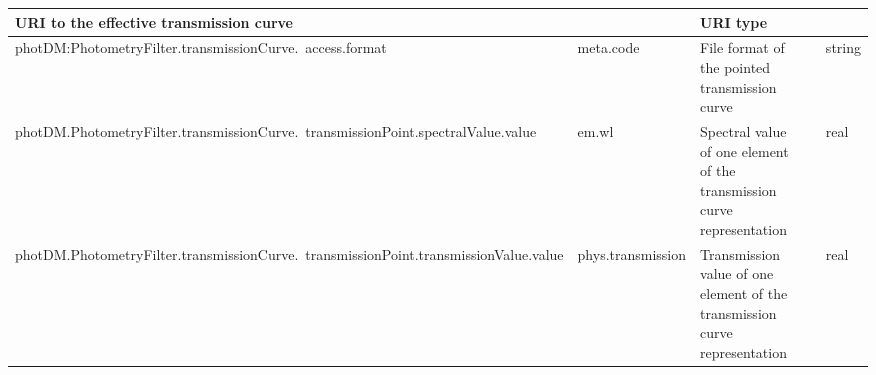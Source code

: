 \documentclass[11pt,a4paper]{ivoa}
\begin{document}
\begin{appendices}
\begin{table}[H]
\begin{adjustbox}{angle=90}
\begin{tabular}{p{2.5in}|p{1.5in}|p{2in}|p{0.74in}|p{0.35in}}
\multicolumn{1}{p{2in}}{{\fontsize{8pt}{8pt}\selectfont URI to the 
effective transmission curve}} &
\multicolumn{1}{p{0.74in}}{} &
\multicolumn{1}{p{0.35in}}{{\fontsize{8pt}{8pt}\selectfont URI type}} \\
\hline
\multicolumn{1}{p{2.5in}}{{\fontsize{8pt}{8pt}
\selectfont photDM:PhotometryFilter.transmissionCurve.\ access.format}} &
\multicolumn{1}{p{1.5in}}{{\fontsize{8pt}{8pt}\selectfont meta.code}} &
\multicolumn{1}{p{2in}}{{\fontsize{8pt}{8pt}\selectfont File format of the pointed transmission curve}} &
\multicolumn{1}{p{0.74in}}{} &
\multicolumn{1}{p{0.35in}}{{\fontsize{8pt}{8pt}\selectfont string}} \\
\hline
\multicolumn{1}{p{2.5in}}{{\fontsize{8pt}{8pt}
\selectfont photDM.PhotometryFilter.transmissionCurve.\ transmissionPoint.spectralValue.value}} &
\multicolumn{1}{p{1.5in}}{{\fontsize{8pt}{8pt}\selectfont em.wl}} &
\multicolumn{1}{p{2in}}{{\fontsize{8pt}{8pt}\selectfont Spectral value 
of one element of the transmission curve representation}} &
\multicolumn{1}{p{0.74in}}{} &
\multicolumn{1}{p{0.35in}}{{\fontsize{8pt}{8pt}\selectfont real}} \\
\hline
\multicolumn{1}{p{2.5in}}{{\fontsize{8pt}{8pt}
\selectfont photDM.PhotometryFilter.transmissionCurve.\ transmissionPoint.transmissionValue.value}} &
\multicolumn{1}{p{1.5in}}{{\fontsize{8pt}{8pt}
\selectfont phys.transmission}} &
\multicolumn{1}{p{2in}}{{\fontsize{8pt}{8pt}\selectfont Transmission value of 
one element of the transmission curve representation}} &
\multicolumn{1}{p{0.74in}}{} &
\multicolumn{1}{p{0.35in}}{{\fontsize{8pt}{8pt}\selectfont real}} \\
\hline

\end{tabular}
\end{adjustbox}
 \end{table}





\newpage



\end{appendices}
\end{document}
